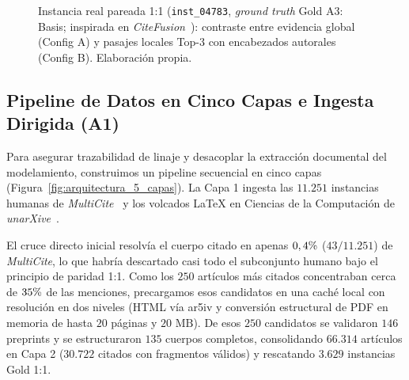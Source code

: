 \documentclass[conference]{IEEEtran}
\newcommand{\pct}{\mbox{\symbol{37}}}
\begin{document}
\begin{figure}[!t]
{%
}
\caption{Instancia real pareada 1:1 (\texttt{inst\_04783}, \textit{ground truth} Gold A3: Basis; inspirada en \textit{CiteFusion}~\cite{paolini2025citefusion}): contraste entre evidencia global (Config A) y pasajes locales Top-3 con encabezados autorales (Config B). Elaboración propia.}
\label{fig:conceptual_citante_citado}
\end{figure}

\subsection{Pipeline de Datos en Cinco Capas e Ingesta Dirigida (A1)}

Para asegurar trazabilidad de linaje y desacoplar la extracción documental del modelamiento, construimos un pipeline secuencial en cinco capas (Figura~\ref{fig:arquitectura_5_capas}). La Capa 1 ingesta las $11.251$ instancias humanas de \textit{MultiCite}~\cite{lauscher2022multicite} y los volcados \LaTeX{} en Ciencias de la Computación de \textit{unarXive}~\cite{besrour2026unarxive}.

El cruce directo inicial resolvía el cuerpo citado en apenas $0,4\pct{}$ ($43/11.251$) de \textit{MultiCite}, lo que habría descartado casi todo el subconjunto humano bajo el principio de paridad 1:1. Como los $250$ artículos más citados concentraban cerca de $35\pct{}$ de las menciones, precargamos esos candidatos en una caché local con resolución en dos niveles (HTML vía ar5iv y conversión estructural de PDF en memoria de hasta $20$ páginas y $20\text{ MB}$). De esos $250$ candidatos se validaron $146$ preprints y se estructuraron $135$ cuerpos completos, consolidando $66.314$ artículos en Capa 2 ($30.722$ citados con fragmentos válidos) y rescatando $3.629$ instancias Gold 1:1.
\end{document}
